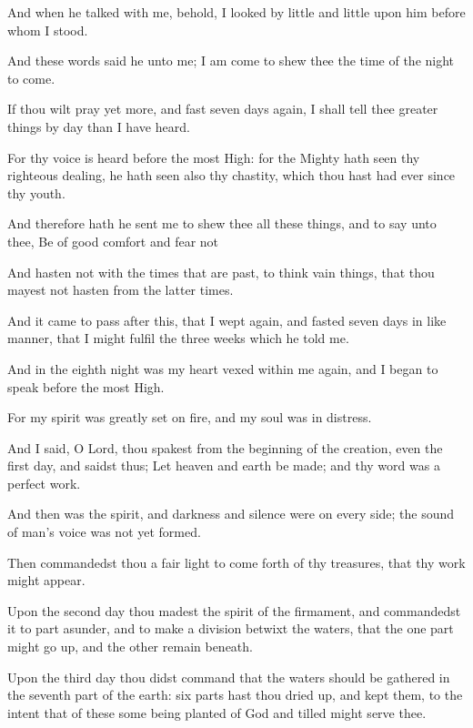 {\par }{\PP {}And when he talked with me, behold, I looked by little and little upon him before whom I stood.
\par }{\PP {}And these words said he unto me; I am come to shew thee the time of the night to come.
\par }{\PP {}If thou wilt pray yet more, and fast seven days again, I shall tell thee greater things by day than I have heard.
\par }{\PP {}For thy voice is heard before the most High: for the Mighty hath seen thy righteous dealing, he hath seen also thy chastity, which thou hast had ever since thy youth.
\par }{\PP {}And therefore hath he sent me to shew thee all these things, and to say unto thee, Be of good comfort and fear not
\par }{\PP {}And hasten not with the times that are past, to think vain things, that thou mayest not hasten from the latter times.
\par }{\PP {}And it came to pass after this, that I wept again, and fasted seven days in like manner, that I might fulfil the three weeks which he told me.
\par }{\PP {}And in the eighth night was my heart vexed within me again, and I began to speak before the most High.
\par }{\PP {}For my spirit was greatly set on fire, and my soul was in distress.
\par }{\PP {}And I said, O Lord, thou spakest from the beginning of the creation, even the first day, and saidst thus; Let heaven and earth be made; and thy word was a perfect work.
\par }{\PP {}And then was the spirit, and darkness and silence were on every side; the sound of man’s voice was not yet formed.
\par }{\PP {}Then commandedst thou a fair light to come forth of thy treasures, that thy work might appear.
\par }{\PP {}Upon the second day thou madest the spirit of the firmament, and commandedst it to part asunder, and to make a division betwixt the waters, that the one part might go up, and the other remain beneath.
\par }{\PP {}Upon the third day thou didst command that the waters should be gathered in the seventh part of the earth: six parts hast thou dried up, and kept them, to the intent that of these some being planted of God and tilled might serve thee.
}
